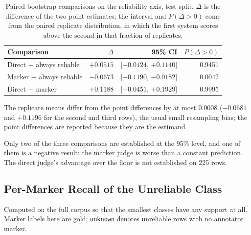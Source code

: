 \documentclass{zapiski}
\begin{document}
\begin{table}[H]
\centering
\caption{Paired bootstrap comparisons on the reliability axis, test split.
$\Delta$ is the difference of the two point estimates; the interval and
$P(\Delta>0)$ come from the paired replicate distribution, in which the first
system scores above the second in that fraction of replicates.}
\label{tab:bootstrap-delta}
\footnotesize
\begin{tabular}{lrrr}
\toprule
Comparison & $\Delta$ & 95\% CI & $P(\Delta>0)$ \\
\midrule
Direct $-$ always reliable & $+0.0515$ & [$-0.0124$, $+0.1140$] & 0.9451 \\
Marker $-$ always reliable & $-0.0673$ & [$-0.1190$, $-0.0182$] & 0.0042 \\
Direct $-$ marker          & $+0.1188$ & [$+0.0451$, $+0.1929$] & 0.9995 \\
\bottomrule
\end{tabular}
\end{table}

The replicate means differ from the point differences by at most 0.0008
($-0.0681$ and $+0.1196$ for the second and third rows), the usual small
resampling bias; the point differences are reported because they are the
estimand.

Only two of the three comparisons are established at the 95\% level, and one
of them is a negative result: the marker judge is worse than a constant
prediction. The direct judge's advantage over the floor is not established on
225 rows.

\subsection{Per-Marker Recall of the Unreliable Class}
\label{sec:appendix-permarker}

Computed on the full corpus so that the smallest classes have any support at
all. Marker labels here are gold; \texttt{unknown} denotes unreliable rows
with no annotator marker.
\end{document}
